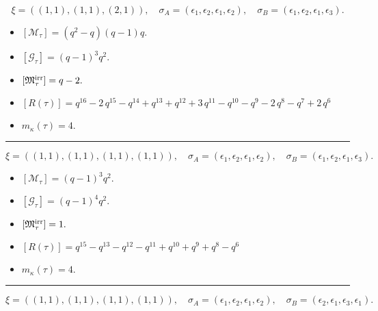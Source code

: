 \documentclass[10pt,a4paper]{amsart}
\begin{document}
$$\xi = ({(1, 1)}, {(1, 1)}, {(2, 1)}),\quad \sigma_A = ({{\epsilon_1}}, {{\epsilon_2}}, {{\epsilon_1, \epsilon_2}}),\quad \sigma_B = ({{\epsilon_1}}, {{\epsilon_2}}, {{\epsilon_1, \epsilon_3}}).$$

\begin{itemize}
 \item $[\mathcal{M}_{\tau}] = {\left(q^{2} - q\right)} {\left(q - 1\right)} q .$

 \item $[\mathcal{G}_{\tau}] = {\left(q - 1\right)}^{3} q^{2} .$

 \item $[{\frak M}_{\tau}^{\textrm{irr}}] = q - 2 .$

 \item $[R(\tau)] = q^{16} - 2 \, q^{15} - q^{14} + q^{13} + q^{12} + 3 \, q^{11} - q^{10} - q^{9} - 2 \, q^{8} - q^{7} + 2 \, q^{6} $

 \item $m_{\kappa}(\tau) = 4 .$

 \end{itemize}
\noindent\rule{8cm}{0.4pt}

$$\xi = ({(1, 1)}, {(1, 1)}, {(1, 1)}, {(1, 1)}),\quad \sigma_A = ({{\epsilon_1}}, {{\epsilon_2}}, {{\epsilon_1}}, {{\epsilon_2}}),\quad \sigma_B = ({{\epsilon_1}}, {{\epsilon_2}}, {{\epsilon_1}}, {{\epsilon_3}}).$$

\begin{itemize}
 \item $[\mathcal{M}_{\tau}] = {\left(q - 1\right)}^{3} q^{2} .$

 \item $[\mathcal{G}_{\tau}] = {\left(q - 1\right)}^{4} q^{2} .$

 \item $[{\frak M}_{\tau}^{\textrm{irr}}] = 1 .$

 \item $[R(\tau)] = q^{15} - q^{13} - q^{12} - q^{11} + q^{10} + q^{9} + q^{8} - q^{6} $

 \item $m_{\kappa}(\tau) = 4 .$

 \end{itemize}
\noindent\rule{8cm}{0.4pt}

$$\xi = ({(1, 1)}, {(1, 1)}, {(1, 1)}, {(1, 1)}),\quad \sigma_A = ({{\epsilon_1}}, {{\epsilon_2}}, {{\epsilon_1}}, {{\epsilon_2}}),\quad \sigma_B = ({{\epsilon_2}}, {{\epsilon_1}}, {{\epsilon_3}}, {{\epsilon_1}}).$$
\end{document}
